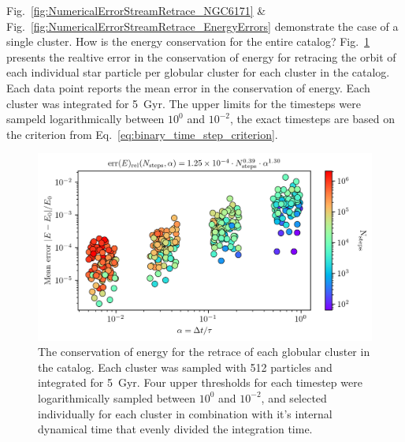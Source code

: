         Fig.~\ref{fig:NumericalErrorStreamRetrace_NGC6171} \& Fig.~\ref{fig:NumericalErrorStreamRetrace_EnergyErrors} demonstrate the case of a single cluster. How is the energy conservation for the entire catalog? Fig.~\ref{fig:NumericalErrorStreamRetraceEnergyConservation} presents the realtive error in the conservation of energy for retracing the orbit of each individual star particle per globular cluster for each cluster in the catalog. Each data point reports the mean error in the conservation of energy. Each cluster was integrated for 5~Gyr. The upper limits for the timesteps were sampeld logarithmically between $10^{0}$ and $10^{-2}$, the exact timesteps are based on the criterion from Eq.~\ref{eq:binary_time_step_criterion}.

        \begin{figure}
            \centering 
            \includegraphics[width=\linewidth]{images/NumericalErrorStreamRetraceEnergyConservation.png}
            \caption[Relative error in energy conservation of stream generation for the whole catalog]{The conservation of energy for the retrace of each globular cluster in the catalog. Each cluster was sampled with 512 particles and integrated for 5~Gyr. Four upper thresholds for each timestep were logarithmically sampled between $10^{0}$ and $10^{-2}$, and selected individually for each cluster in combination with it's internal dynamical time that evenly divided the integration time. }
            \label{fig:NumericalErrorStreamRetraceEnergyConservation}
        \end{figure}

